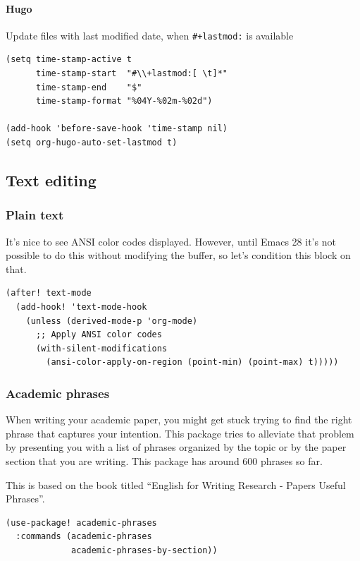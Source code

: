\documentclass[11pt]{article}
\begin{document}
\paragraph{Hugo}
\label{sec:org000614d}
Update files with last modified date, when \texttt{\#+lastmod:} is available

\begin{verbatim}
(setq time-stamp-active t
      time-stamp-start  "#\\+lastmod:[ \t]*"
      time-stamp-end    "$"
      time-stamp-format "%04Y-%02m-%02d")

(add-hook 'before-save-hook 'time-stamp nil)
(setq org-hugo-auto-set-lastmod t)
\end{verbatim}

\subsection{Text editing}
\label{sec:org28656cb}
\subsubsection{Plain text}
\label{sec:org3de50bb}
It's nice to see ANSI color codes displayed. However, until Emacs 28 it's not
possible to do this without modifying the buffer, so let's condition this block
on that.

\begin{verbatim}
(after! text-mode
  (add-hook! 'text-mode-hook
    (unless (derived-mode-p 'org-mode)
      ;; Apply ANSI color codes
      (with-silent-modifications
        (ansi-color-apply-on-region (point-min) (point-max) t)))))
\end{verbatim}

\subsubsection{Academic phrases}
\label{sec:org76586fa}
When writing your academic paper, you might get stuck trying to find the right
phrase that captures your intention. This package tries to alleviate that
problem by presenting you with a list of phrases organized by the topic or by
the paper section that you are writing. This package has around 600 phrases so
far.

This is based on the book titled ``English for Writing Research - Papers Useful
Phrases''.

\begin{verbatim}
(use-package! academic-phrases
  :commands (academic-phrases
             academic-phrases-by-section))
\end{verbatim}
\end{document}
